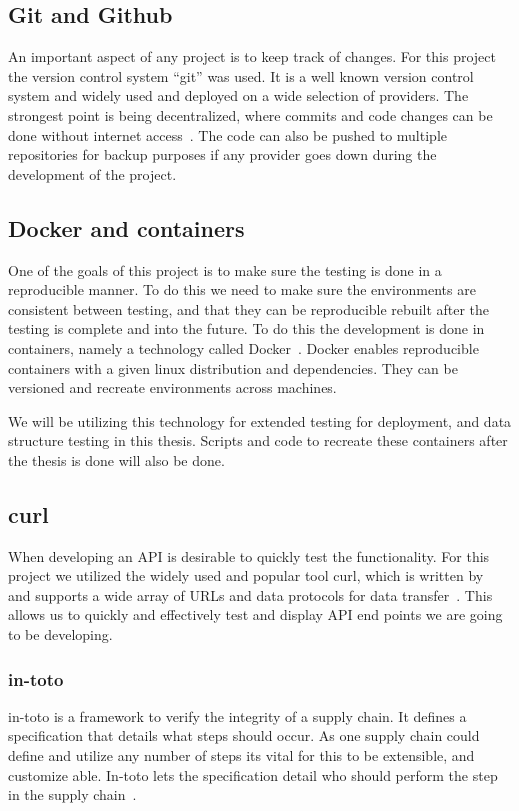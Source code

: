 \documentclass[../Main/thesis.tex]{subfiles}
\begin{document}
\subsection*{Git and Github}%
\label{sub:git_and_github}
An important aspect of any project is to keep track of changes. For this project
the version control system ``git'' was used. It is a well known version control
system and widely used and deployed on a wide selection of providers. The
strongest point is being decentralized, where commits and code changes can be
done without internet access~\cite{git}. The code can also be pushed to multiple
repositories for backup purposes if any provider goes down during the
development of the project.


\subsection*{Docker and containers}%
\label{sub:docker_and_containers}
One of the goals of this project is to make sure the testing is done in a
reproducible manner. To do this we need to make sure the environments are
consistent between testing, and that they can be reproducible rebuilt after the
testing is complete and into the future. To do this the development is done in
containers, namely a technology called Docker~\cite{docker}. Docker enables
reproducible containers with a given linux distribution and dependencies. They
can be versioned and recreate environments across machines.

We will be utilizing this technology for extended testing for deployment, and
data structure testing in this thesis. Scripts and code to recreate these
containers after the thesis is done will also be done.

\subsection*{curl}%
\label{sub:curl}
When developing an API is desirable to quickly test the functionality. For this
project we utilized the widely used and popular tool curl, which is written
by~\citeauthor{curl} and supports a wide array of URLs and data protocols for
data transfer~\cite{curl}. This allows us to quickly and effectively test and
display API end points we are going to be developing.


\subsubsection*{in-toto}%
\label{sub:graphviz}
in-toto is a framework to verify the integrity of a supply chain. It defines a
specification that details what steps should occur. As one supply chain could
define and utilize any number of steps its vital for this to be extensible, and
customize able. In-toto lets the specification detail who should perform the
step in the supply chain~\cite{in-toto}.
\end{document}
